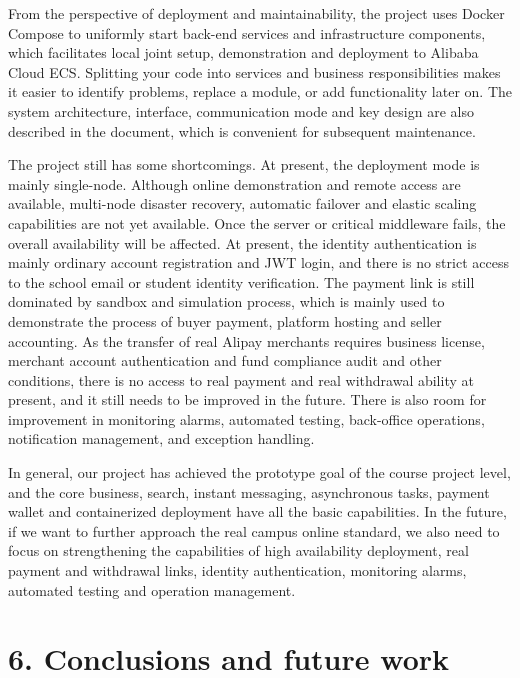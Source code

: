 \documentclass{article}
\begin{document}
From the perspective of deployment and maintainability, the project uses Docker Compose to uniformly start back-end services and infrastructure components, which facilitates local joint setup, demonstration and deployment to Alibaba Cloud ECS. Splitting your code into services and business responsibilities makes it easier to identify problems, replace a module, or add functionality later on. The system architecture, interface, communication mode and key design are also described in the document, which is convenient for subsequent maintenance.

The project still has some shortcomings. At present, the deployment mode is mainly single-node. Although online demonstration and remote access are available, multi-node disaster recovery, automatic failover and elastic scaling capabilities are not yet available. Once the server or critical middleware fails, the overall availability will be affected. At present, the identity authentication is mainly ordinary account registration and JWT login, and there is no strict access to the school email or student identity verification. The payment link is still dominated by sandbox and simulation process, which is mainly used to demonstrate the process of buyer payment, platform hosting and seller accounting. As the transfer of real Alipay merchants requires business license, merchant account authentication and fund compliance audit and other conditions, there is no access to real payment and real withdrawal ability at present, and it still needs to be improved in the future. There is also room for improvement in monitoring alarms, automated testing, back-office operations, notification management, and exception handling.

In general, our project has achieved the prototype goal of the course project level, and the core business, search, instant messaging, asynchronous tasks, payment wallet and containerized deployment have all the basic capabilities. In the future, if we want to further approach the real campus online standard, we also need to focus on strengthening the capabilities of high availability deployment, real payment and withdrawal links, identity authentication, monitoring alarms, automated testing and operation management.

\section{6. Conclusions and future work}
\end{document}
